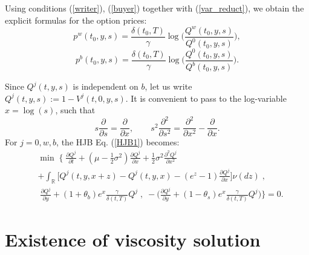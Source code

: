 Using conditions (\ref{writer}), (\ref{buyer}) together with (\ref{var_reduct}), we obtain the explicit formulas for the option prices:
\begin{equation}\label{opt_w}
 p^w(t_0,y,s) = \frac{\delta(t_0,T)}{\gamma} \log \biggl( \frac{Q^w(t_0,y,s)}{Q^0(t_0,y,s)} \biggr),
\end{equation}
\begin{equation}\label{opt_b}
 p^b(t_0,y,s) = \frac{\delta(t_0,T)}{\gamma} \log \biggl( \frac{Q^0(t_0,y,s)}{Q^b(t_0,y,s)} \biggr).
\end{equation}

Since $Q^j(t,y,s)$ is independent on $b$, let us write
$ Q^j(t,y,s) := 1 - V^j(t,0,y,s)$.
It is convenient to pass to the log-variable $x = \log(s)$, such that
\begin{equation}\label{log_var}
s \frac{\partial}{\partial s} = \frac{\partial}{\partial x}, \hspace{2em} 
s^2 \frac{\partial^2}{\partial s^2} = \frac{\partial^2}{\partial x^2} - \frac{\partial}{\partial x} . 
\end{equation}
For $j=0,w,b$, the HJB Eq. (\ref{HJB1}) becomes:
\begin{align}\label{HJB2}
& \min \; \biggl\{ \; \frac{\partial Q^j}{\partial t} + (\mu-\frac{1}{2}\sigma^2) \frac{\partial Q^j}{\partial x}
+ \frac{1}{2}\sigma^2 \frac{\partial^2 Q^j}{\partial x^2} \\ \nonumber
&+ \int_\mathbb{R}
\biggl[ Q^j(t,y,x+z) - Q^j(t,y,x) - (e^z-1)\frac{\partial Q^j}{\partial x} \biggr] \nu(dz) \;,  \\ \nonumber
& \; \frac{\partial Q^j}{\partial y} +(1+\theta_b) e^x \frac{\gamma}{\delta(t,T)}Q^j \; , 
\; -\biggl( \frac{\partial Q^j}{\partial y}+(1-\theta_s)e^x \frac{\gamma}{\delta(t,T)} Q^j 
\biggr) \biggr\} = 0. 
 \end{align}








\section{Existence of viscosity solution}\label{Existence_viscosity}

